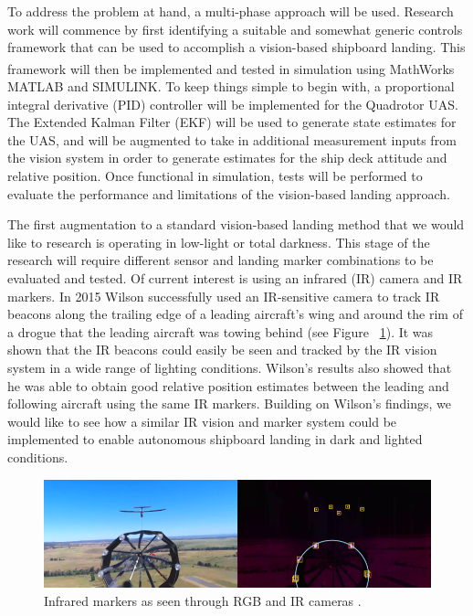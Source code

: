 \documentclass[12pt, letterpaper]{article}
\begin{document}
To address the problem at hand, a multi-phase approach will be used.  Research work will commence by first identifying a suitable and somewhat generic controls framework that can be used to accomplish a vision-based shipboard landing.  This framework will then be implemented and tested in simulation using MathWorks\textsuperscript{\textregistered} MATLAB and SIMULINK.  To keep things simple to begin with, a proportional integral derivative (PID) controller will be implemented for the Quadrotor UAS.  The Extended Kalman Filter (EKF) will be used to generate state estimates for the UAS, and will be augmented to take in additional measurement inputs from the vision system in order to generate estimates for the ship deck attitude and relative position.  Once functional in simulation, tests will be performed to evaluate the performance and limitations of the vision-based landing approach.

The first augmentation to a standard vision-based landing method that we would like to research is operating in low-light or total darkness.  This stage of the research will require different sensor and landing marker combinations to be evaluated and tested.  Of current interest is using an infrared (IR) camera and IR markers.  In 2015 Wilson \cite{Hornung,Hornung2013} successfully used an IR-sensitive camera to track IR beacons along the trailing edge of a leading aircraft's wing and around the rim of a drogue that the leading aircraft was towing behind (see Figure ~\ref{fig:irmarkers}).  It was shown that the IR beacons could easily be seen and tracked by the IR vision system in a wide range of lighting conditions.  Wilson's results also showed that he was able to obtain good relative position estimates between the leading and following aircraft using the same IR markers.  Building on Wilson's findings, we would like to see how a similar IR vision and marker system could be implemented to enable autonomous shipboard landing in dark and lighted conditions. 

\begin{figure}[t] %
   \centering
   \includegraphics[trim = 0mm 0mm 0mm 0mm,clip,width=6in]{ir_drogue.png}
   \caption{Infrared markers as seen through RGB and IR cameras \cite{WilsonDB.2015}.}
   \label{fig:irmarkers}
\end{figure}
\end{document}
